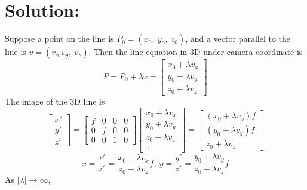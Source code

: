 \documentclass[12pt]{article}
\begin{document}
\section{Solution:}
Suppose a point on the line is $P_0 = (x_0,\ y_0,\ z_0)$, and a vector parallel to the line is $v = (v_x\  v_y,\ v_z)$. Then the line equation in 3D under camera coordinate is 
\begin{equation*}
P = P_0 + \lambda v = \left[ \begin{array}{c}
x_0 + \lambda v_x\\
y_0 + \lambda v_y\\
z_0 + \lambda v_z
\end{array} \right ]
\end{equation*}
The image of the 3D line is 
\begin{equation*}
\left[ \begin{array}{c}
x'\\
y'\\
z'
\end{array} \right ] = \left[ \begin{array}{cccc}
f & 0 & 0 & 0\\
0 & f & 0 & 0\\
0 & 0 & 1 & 0
\end{array} \right ] \left[ \begin{array}{c}
x_0 + \lambda v_x\\
y_0 + \lambda v_y\\
z_0 + \lambda v_z\\
1
\end{array} \right ] = \left[ \begin{array}{c}
(x_0 + \lambda v_x)f\\
(y_0 + \lambda v_y)f\\
z_0 + \lambda v_z
\end{array} \right ]
\end{equation*}
\begin{equation*}
x = \frac{x'}{z'} = \frac{x_0 + \lambda v_x}{z_0 + \lambda v_z}f, \ y = \frac{y'}{z'} = \frac{y_0 + \lambda v_y}{z_0 + \lambda v_z}f
\end{equation*}
As $|\lambda| \to \infty$,
\end{document}
